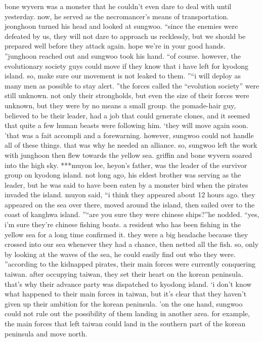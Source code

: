 bone wyvern was a monster that he couldn’t even dare to deal with until yesterday.
now, he served as the necromancer’s means of transportation.
jeonghoon turned his head and looked at sungwoo.
“since the enemies were defeated by us, they will not dare to approach us recklessly, but we should be prepared well before they attack again.
 hope we’re in your good hands.
”junghoon reached out and sungwoo took his hand.
“of course.
 however, the evolutionary society guys could move if they know that i have left for kyodong island.
 so, make sure our movement is not leaked to them.
”“i will deploy as many men as possible to stay alert.
”the forces called the “evolution society” were still unknown.
 not only their strongholds, but even the size of their forces were unknown, but they were by no means a small group.
the pomade-hair guy, believed to be their leader, had a job that could generate clones, and it seemed that quite a few human beasts were following him.
‘they will move again soon.
’that was a fait accompli and a forewarning.
however, sungwoo could not handle all of these things.
 that was why he needed an alliance.
 so, sungwoo left the work with junghoon then flew towards the yellow sea.
griffin and bone wyvern soared into the high sky.
***muyon lee, heyon’s father, was the leader of the survivor group on kyodong island.
 not long ago, his eldest brother was serving as the leader, but he was said to have been eaten by a monster bird when the pirates invaded the island.
muyon said, “i think they appeared about 12 hours ago.
 they appeared on the sea over there, moved around the island, then sailed over to the coast of kanghwa island.
”“are you sure they were chinese ships?”he nodded.
“yes, i’m sure they’re chinese fishing boats.
 a resident who has been fishing in the yellow sea for a long time confirmed it.
 they were a big headache because they crossed into our sea whenever they had a chance, then netted all the fish.
 so, only by looking at the waves of the sea, he could easily find out who they were.
”according to the kidnapped pirates, their main forces were currently conquering taiwan.
 after occupying taiwan, they set their heart on the korean peninsula.
 that’s why their advance party was dispatched to kyodong island.
‘i don’t know what happened to their main forces in taiwan, but it’s clear that they haven’t given up their ambition for the korean peninsula.
’on the one hand, sungwoo could not rule out the possibility of them landing in another area.
for example, the main forces that left taiwan could land in the southern part of the korean peninsula and move north.
